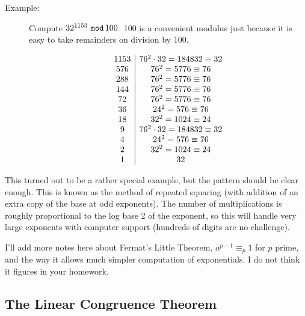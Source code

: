 \documentclass[12pt]{article}
\begin{document}
\begin{description}

\item[Example:]  Compute $32^{1153}\,\,{\tt mod}\, 100$.  100 is a convenient modulus just because it is easy to take remainders on division by 100.

$$\begin{array}{c | c}

1153 & 76^2\cdot 32 = 184832 \equiv 32\\

576 & 76^2 = 5776 \equiv 76\\

288 & 76^2 = 5776 \equiv 76\\

144 &  76^2 = 5776 \equiv 76\\

72 & 76^2 = 5776 \equiv 76\\

36 &  24^2  =576 \equiv 76\\

18 & 32^2 = 1024 \equiv 24\\

9 &  76^2\cdot 32 = 184832 \equiv 32\\

4 & 24^2 = 576 \equiv 76\\

2 &  32^2 = 1024 \equiv 24\\

1 &  32\\

\end{array}$$

\end{description}

This turned out to be a rather special example, but the pattern should be clear enough.  This is known as the method of repeated squaring (with addition of an extra copy of the base at odd exponents).  The number of multiplications is roughly proportional to the log base 2 of the exponent, so this will handle very large exponents with computer support (hundreds of digits are no challenge).

I'll add more notes here about Fermat's Little Theorem, $a^{p-1} \equiv_p 1$ for $p$ prime, and the way it allows much simpler computation of exponentials.  I do not think it figures in your homework.


\subsection{The Linear Congruence Theorem}
\end{document}

